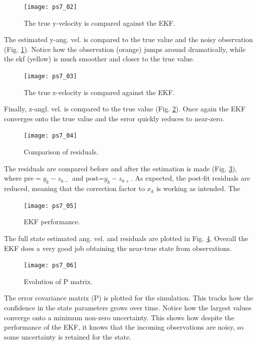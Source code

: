 \documentclass[12pt, letterpaper]{article}
\begin{document}
\begin{figure}[H]
	\centering
	\texttt{[image: ps7\_02]}
	\caption{The true y-velocity is compared against the EKF.}
	\label{7:ekfy}
\end{figure}

The estimated y-ang. vel. is compared to the true value and the noisy observation (Fig. \ref{7:ekfy}). Notice how the observation (orange) jumps around dramatically, while the ekf (yellow) is much smoother and closer to the true value.

\begin{figure}[H]
	\centering
	\texttt{[image: ps7\_03]}
	\caption{The true z-velocity is compared against the EKF.}
	\label{7:ekfz}
\end{figure}

Finally, z-angl. vel. is compared to the true value (Fig. \ref{7:ekfz}). Once again the EKF converges onto the true value and the error quickly reduces to near-zero.

\begin{figure}[H]
	\centering
	\texttt{[image: ps7\_04]}
	\caption{Comparison of residuals.}
	\label{7:04}
\end{figure}

The residuals are compared before and after the estimation is made (Fig. \ref{7:04}), where pre$=y_k-z_{k-}$ and post=$y_k-z_{k+}$. As expected, the post-fit residuals are reduced, meaning that the correction factor to $x_k$ is working as intended. The 

\begin{figure}[H]
	\centering
	\texttt{[image: ps7\_05]}
	\caption{EKF performance.}
	\label{7:05}
\end{figure}

The full state estimated ang. vel. and residuals are plotted in Fig. \ref{7:05}. Overall the EKF does a very good job obtaining the near-true state from observations.

\begin{figure}[H]
	\centering
	\texttt{[image: ps7\_06]}
	\caption{Evolution of P matrix.}
	\label{7:ekf}
\end{figure}

The error covariance matrix (P) is plotted for the simulation. This tracks how the confidence in the state parameters grows over time. Notice how the largest values converge onto a minimum non-zero uncertainty. This shows how despite the performance of the EKF, it knows that the incoming observations are noisy, so some uncertainty is retained for the state.
\end{document}
